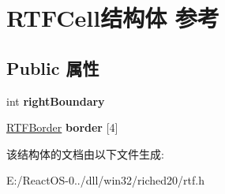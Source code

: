 \hypertarget{struct_r_t_f_cell}{}\section{R\+T\+F\+Cell结构体 参考}
\label{struct_r_t_f_cell}
\subsection*{Public 属性}
\begin{DoxyCompactItemize}
\item 
\mbox{\label{struct_r_t_f_cell_ae0962bd00c963e6edbc804857265ae2e}} 
int {\bfseries right\+Boundary}
\item 
\mbox{\label{struct_r_t_f_cell_a6866928f267fd03b81648b179cecf23b}} 
\hyperlink{struct_r_t_f_border}{R\+T\+F\+Border} {\bfseries border} \mbox{[}4\mbox{]}
\end{DoxyCompactItemize}


该结构体的文档由以下文件生成\+:\begin{DoxyCompactItemize}
\item 
E\+:/\+React\+O\+S-\/0../dll/win32/riched20/rtf.\+h\end{DoxyCompactItemize}

